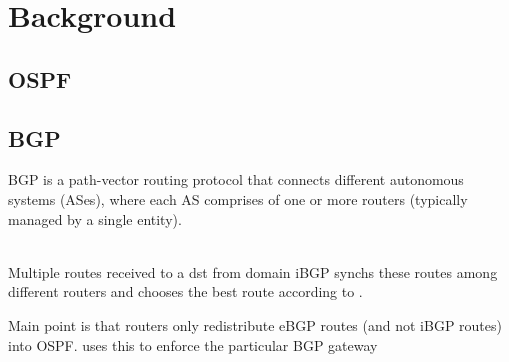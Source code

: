 \section{Background}
\subsection{OSPF}

\subsection{BGP}
BGP is a path-vector routing protocol that connects 
different autonomous systems (ASes), where each AS
comprises of one or more routers (typically managed
by a single entity). 

\\
Multiple routes received to a dst from domain
iBGP synchs these routes among different routers
and chooses the best route according to .

Main point is that routers only redistribute
eBGP routes (and not iBGP routes) into OSPF.
\name uses this to enforce the particular
BGP gateway

